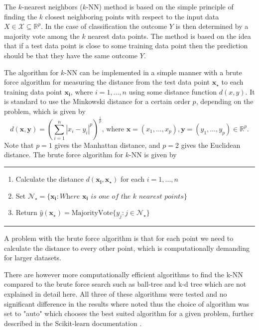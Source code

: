 \documentclass[../../project.tex]{subfiles}
\begin{document}
	The $k$-nearest neighbors ($k$-NN) method is based on the simple principle of finding the $k$ closest neighboring points with respect to the input data $X \in \mathcal{X} \subseteq \mathbb{R}^p$. In the case of classification the outcome $Y$ is then determined by a majority vote among the $k$ nearest data points. The method is based on the idea that if a test data point is close to some training data point then the prediction should be that they have the same outcome $Y$.
	
	The algorithm for $k$-NN can be implemented in a simple manner with a brute force algorithm for measuring the distance from the test data point $\boldsymbol{x_{\star}}$ to each training data point $\boldsymbol{x_{i}}$, where $i = 1,...,n$ using some distance function $d(x,y)$. It is standard to use the Minkowski distance for a certain order $p$, depending on the problem, which is given by
	\begin{equation}
	d(\boldsymbol{x},\boldsymbol{y}) = \left( \sum_{i=1}^{n} |x_{i} - y_{i}|^{p} \right)^{\frac{1}{p}}\text{, where } \boldsymbol{x} = (x_1,...,x_p),\boldsymbol{y}=(y_1,...,y_p)
	\in \mathbb{R}^p.
	\end{equation}
	Note that $p=1$ gives the Manhattan distance, and $p=2$ gives the Euclidean distance. The brute force algorithm for $k$-NN is given by \citep{Kursbok}
	\par\noindent\rule{\textwidth}{0.4pt}
	\begin{enumerate}
		\item Calculate the distance $d(\boldsymbol{x_{i}},\boldsymbol{x_{\star}})$ for each $i = 1,...,n$
		\item Set $\mathcal{N}_{\star} = \{ \boldsymbol{x_i}: \textit{Where } \boldsymbol{x_i} \textit{ is one of the k nearest points} \}$
		\item Return $\hat{y}(\boldsymbol{x_{\star}}) = \text{MajorityVote}\{y_j : j \in \mathcal{N}_{\star}\} $
	\end{enumerate}
	\par\noindent\rule{\textwidth}{0.4pt}
	
	
	A problem with the brute force algorithm is that for each point we need to calculate the distance to every other point, which is computationally demanding for larger datasets.
	
	There are however more computationally  efficient algorithms to find the k-NN compared to the brute force search such as ball-tree and k-d tree which are not explained in detail here. All three of these algorithms were tested and no significant difference in the results where noted thus the choice of algorithm was set to "auto" which chooses the best suited algorithm for a given problem, further described in the Scikit-learn documentation \citep{sklearn}. 
	
\end{document}
